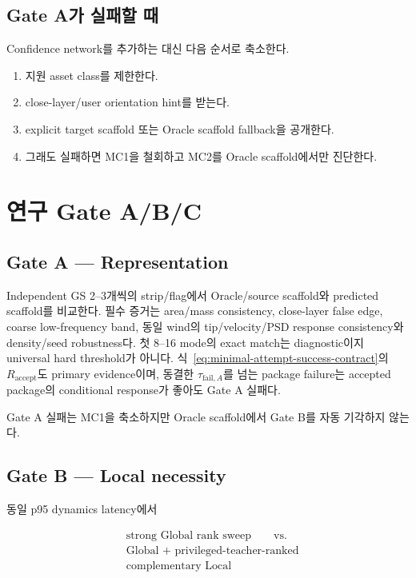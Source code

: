 \documentclass[11pt]{article}
\begin{document}
\subsection{Gate A가 실패할 때}

Confidence network를 추가하는 대신 다음 순서로 축소한다.

\begin{enumerate}
  \item 지원 asset class를 제한한다.
  \item close-layer/user orientation hint를 받는다.
  \item explicit target scaffold 또는 Oracle scaffold fallback을 공개한다.
  \item 그래도 실패하면 MC1을 철회하고 MC2를 Oracle scaffold에서만 진단한다.
\end{enumerate}

\section{연구 Gate A/B/C}

\subsection{Gate A --- Representation}

Independent GS 2--3개씩의 strip/flag에서 Oracle/source scaffold와 predicted scaffold를 비교한다.
필수 증거는 area/mass consistency, close-layer false edge, coarse low-frequency band,
동일 wind의 tip/velocity/PSD response consistency와 density/seed robustness다.
첫 8--16 mode의 exact match는 diagnostic이지 universal hard threshold가 아니다.
식~\eqref{eq:minimal-attempt-success-contract}의 \(R_{\mathrm{accept}}\)도 primary evidence이며,
동결한 \(\tau_{\mathrm{fail},A}\)를 넘는 package failure는 accepted package의 conditional
response가 좋아도 Gate A 실패다.

Gate A 실패는 MC1을 축소하지만 Oracle scaffold에서 Gate B를 자동 기각하지 않는다.

\subsection{Gate B --- Local necessity}

동일 p95 dynamics latency에서

\[
\begin{aligned}
  &\text{strong Global rank sweep}\qquad\text{vs.}\\
  &\text{Global + privileged-teacher-ranked}\\
  &\text{complementary Local}
\end{aligned}
\]
\end{document}
